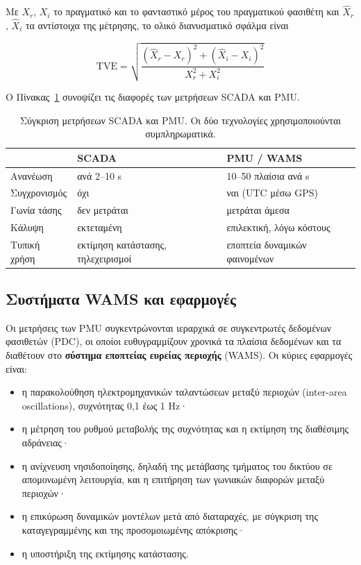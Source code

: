 Με $X_r$, $X_i$ το πραγματικό και το φανταστικό μέρος του πραγματικού φασιθέτη και
$\hat{X}_r$, $\hat{X}_i$ τα αντίστοιχα της μέτρησης, το ολικό διανυσματικό σφάλμα είναι

\begin{equation}
\mathrm{TVE} = \sqrt{\frac{(\hat{X}_r - X_r)^2 + (\hat{X}_i - X_i)^2}{X_r^2 + X_i^2}}
\label{eq:tve}
\end{equation}

Ο Πίνακας~\ref{tab:scada-pmu} συνοψίζει τις διαφορές των μετρήσεων SCADA και PMU.

\begin{table}[!htbp]
\centering
\begin{tabular}{lll}
\hline
 & SCADA & PMU / WAMS \\
\hline
Ανανέωση         & ανά 2--10 s        & 10--50 πλαίσια ανά s \\
Συγχρονισμός     & όχι                & ναι (UTC μέσω GPS) \\
Γωνία τάσης      & δεν μετράται       & μετράται άμεσα \\
Κάλυψη           & εκτεταμένη         & επιλεκτική, λόγω κόστους \\
Τυπική χρήση     & εκτίμηση κατάστασης, τηλεχειρισμοί & εποπτεία δυναμικών φαινομένων \\
\hline
\end{tabular}
\caption{Σύγκριση μετρήσεων SCADA και PMU. Οι δύο τεχνολογίες χρησιμοποιούνται
συμπληρωματικά.}
\label{tab:scada-pmu}
\end{table}

\subsection{Συστήματα WAMS και εφαρμογές}

Οι μετρήσεις των PMU συγκεντρώνονται ιεραρχικά σε συγκεντρωτές δεδομένων φασιθετών (PDC), οι
οποίοι ευθυγραμμίζουν χρονικά τα πλαίσια δεδομένων και τα διαθέτουν στο \textbf{σύστημα
εποπτείας ευρείας περιοχής} (WAMS). Οι κύριες εφαρμογές είναι:

\begin{itemize}
\item η παρακολούθηση ηλεκτρομηχανικών ταλαντώσεων μεταξύ περιοχών (inter-area
      oscillations), συχνότητας 0,1 έως 1 Hz·
\item η μέτρηση του ρυθμού μεταβολής της συχνότητας και η εκτίμηση της διαθέσιμης
      αδράνειας·
\item η ανίχνευση νησιδοποίησης, δηλαδή της μετάβασης τμήματος του δικτύου σε απομονωμένη
      λειτουργία, και η επιτήρηση των γωνιακών διαφορών μεταξύ περιοχών·
\item η επικύρωση δυναμικών μοντέλων μετά από διαταραχές, με σύγκριση της καταγεγραμμένης
      και της προσομοιωμένης απόκρισης·
\item η υποστήριξη της εκτίμησης κατάστασης.
\end{itemize}

